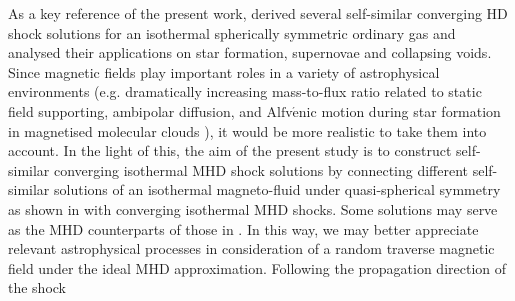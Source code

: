 \documentclass[fleqn,usenatbib]{mnras}
\begin{document}
As a key reference of the present work, \citet{lou2014self} derived several self-similar converging HD shock solutions for an isothermal spherically symmetric ordinary gas and analysed their applications on star formation, supernovae and collapsing voids. Since magnetic fields play important roles in a variety of astrophysical environments (e.g. dramatically increasing mass-to-flux ratio related to static field supporting, ambipolar diffusion, and $\text{Alfv}\mathrm{\acute{e}}\text{nic}$ motion during star formation in magnetised molecular clouds \citep{mckee2007theory,crutcher1999magnetic}), it would be more realistic to take them into account. In the light of this, the aim of the present study is to construct self-similar converging isothermal MHD shock solutions by connecting different self-similar solutions of an isothermal magneto-fluid under quasi-spherical symmetry as shown in \cite{yuLou2005} with converging isothermal MHD shocks. Some solutions may serve as the MHD counterparts of those in \citet{lou2014self}. In this way, we may better appreciate relevant astrophysical processes in consideration of a random traverse magnetic field under the ideal MHD approximation. Following the propagation direction of the shock
\end{document}

